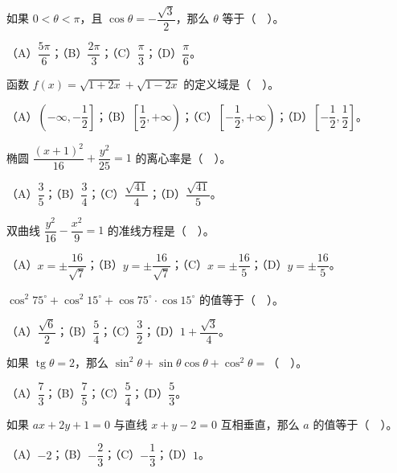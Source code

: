 \begin{question}
如果 $0<\theta<\pi$，且 $\cos\theta=-\dfrac{\sqrt3}{2}$，那么 $\theta$ 等于（　）。

（A）$\dfrac{5\pi}{6}$；（B）$\dfrac{2\pi}{3}$；（C）$\dfrac{\pi}{3}$；（D）$\dfrac{\pi}{6}$。

\end{question}
\begin{question}
函数 $f(x)=\sqrt{1+2x}+\sqrt{1-2x}$ 的定义域是（　）。

（A）$\left(-\infty,-\dfrac12\right]$；（B）$\left[\dfrac12,+\infty\right)$；（C）$\left[-\dfrac12,+\infty\right)$；（D）$\left[-\dfrac12,\dfrac12\right]$。

\end{question}
\begin{question}
椭圆 $\dfrac{(x+1)^2}{16}+\dfrac{y^2}{25}=1$ 的离心率是（　）。

（A）$\dfrac35$；（B）$\dfrac34$；（C）$\dfrac{\sqrt{41}}{4}$；（D）$\dfrac{\sqrt{41}}{5}$。

\end{question}
\begin{question}
双曲线 $\dfrac{y^2}{16}-\dfrac{x^2}{9}=1$ 的准线方程是（　）。

（A）$x=\pm\dfrac{16}{\sqrt7}$；（B）$y=\pm\dfrac{16}{\sqrt7}$；（C）$x=\pm\dfrac{16}{5}$；（D）$y=\pm\dfrac{16}{5}$。

\end{question}
\begin{question}
$\cos^2 75^\circ+\cos^2 15^\circ+\cos 75^\circ\cdot\cos 15^\circ$ 的值等于（　）。

（A）$\dfrac{\sqrt6}{2}$；（B）$\dfrac54$；（C）$\dfrac32$；（D）$1+\dfrac{\sqrt3}{4}$。

\end{question}
\begin{question}
如果 $\operatorname{tg}\theta=2$，那么 $\sin^2\theta+\sin\theta\cos\theta+\cos^2\theta=$（　）。

（A）$\dfrac73$；（B）$\dfrac75$；（C）$\dfrac54$；（D）$\dfrac53$。

\end{question}
\begin{question}
如果 $ax+2y+1=0$ 与直线 $x+y-2=0$ 互相垂直，那么 $a$ 的值等于（　）。

（A）$-2$；（B）$-\dfrac23$；（C）$-\dfrac13$；（D）$1$。

\end{question}
